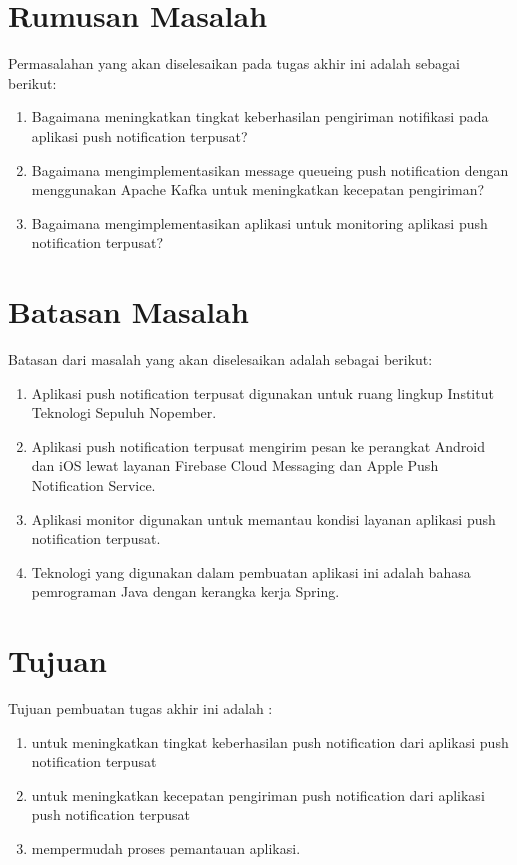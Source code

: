 \section {Rumusan Masalah}
Permasalahan yang akan diselesaikan pada tugas akhir ini adalah sebagai berikut:
\begin {enumerate}
\item Bagaimana meningkatkan tingkat keberhasilan pengiriman notifikasi pada aplikasi push notification terpusat?
\item Bagaimana mengimplementasikan message queueing push notification dengan menggunakan Apache Kafka untuk meningkatkan kecepatan pengiriman?
\item Bagaimana mengimplementasikan aplikasi untuk monitoring aplikasi push notification terpusat?
\end {enumerate}

\section {Batasan Masalah}
Batasan dari masalah yang akan diselesaikan adalah sebagai berikut:
\begin {enumerate}
\item Aplikasi push notification terpusat digunakan untuk ruang lingkup Institut Teknologi Sepuluh Nopember.
\item Aplikasi push notification terpusat mengirim pesan ke perangkat Android dan iOS lewat layanan Firebase Cloud Messaging dan Apple Push Notification Service.
\item Aplikasi monitor digunakan untuk memantau kondisi layanan aplikasi push notification terpusat.
\item Teknologi yang digunakan dalam pembuatan aplikasi ini adalah bahasa pemrograman Java dengan kerangka kerja Spring.
\end {enumerate}

\section {Tujuan}
Tujuan pembuatan tugas akhir ini adalah :
\begin{enumerate}
	\item untuk meningkatkan tingkat keberhasilan push notification dari aplikasi push notification terpusat
	\item untuk meningkatkan kecepatan pengiriman push notification dari aplikasi push notification terpusat 
	\item mempermudah proses pemantauan aplikasi.
\end{enumerate}

